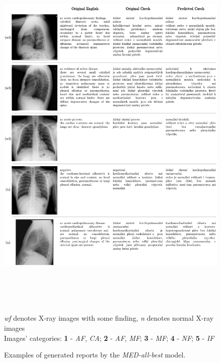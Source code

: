 \begin{figure}[h]\centering
\includegraphics[width=145mm, height=177.5mm]{../img/Examples1}
\caption{Examples of generated reports by the \textit{MED-all-best} model.}
\label{fig01:Examples1}
\textit{wf} denotes X-ray images with some finding, \textit{n} denotes normal X-ray images\\
Images' categories:
\textbf{1} - \textit{AF}, \textit{CA};
\textbf{2} - \textit{AF}, \textit{MF};
\textbf{3} - \textit{MF};
\textbf{4} - \textit{NF};
\textbf{5} - \textit{IF}
\end{figure}


